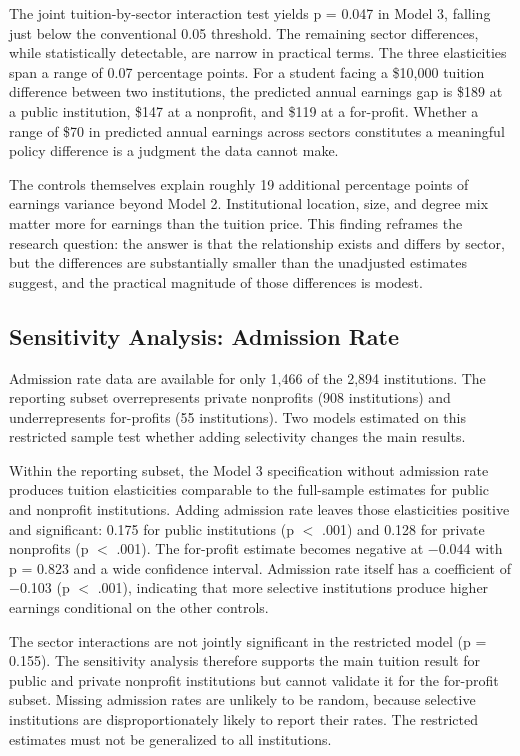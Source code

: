 The joint tuition-by-sector interaction test yields p = 0.047 in Model 3, falling just below the conventional 0.05 threshold. The remaining sector differences, while statistically detectable, are narrow in practical terms. The three elasticities span a range of 0.07 percentage points. For a student facing a \$10,000 tuition difference between two institutions, the predicted annual earnings gap is \$189 at a public institution, \$147 at a nonprofit, and \$119 at a for-profit. Whether a range of \$70 in predicted annual earnings across sectors constitutes a meaningful policy difference is a judgment the data cannot make.

The controls themselves explain roughly 19 additional percentage points of earnings variance beyond Model 2. Institutional location, size, and degree mix matter more for earnings than the tuition price. This finding reframes the research question: the answer is that the relationship exists and differs by sector, but the differences are substantially smaller than the unadjusted estimates suggest, and the practical magnitude of those differences is modest.

\subsection{Sensitivity Analysis: Admission Rate}

Admission rate data are available for only 1,466 of the 2,894 institutions. The reporting subset overrepresents private nonprofits (908 institutions) and underrepresents for-profits (55 institutions). Two models estimated on this restricted sample test whether adding selectivity changes the main results.

Within the reporting subset, the Model 3 specification without admission rate produces tuition elasticities comparable to the full-sample estimates for public and nonprofit institutions. Adding admission rate leaves those elasticities positive and significant: 0.175 for public institutions (p $<$ .001) and 0.128 for private nonprofits (p $<$ .001). The for-profit estimate becomes negative at $-$0.044 with p = 0.823 and a wide confidence interval. Admission rate itself has a coefficient of $-$0.103 (p $<$ .001), indicating that more selective institutions produce higher earnings conditional on the other controls.

The sector interactions are not jointly significant in the restricted model (p = 0.155). The sensitivity analysis therefore supports the main tuition result for public and private nonprofit institutions but cannot validate it for the for-profit subset. Missing admission rates are unlikely to be random, because selective institutions are disproportionately likely to report their rates. The restricted estimates must not be generalized to all institutions.

